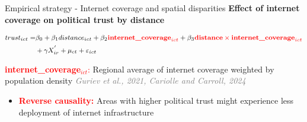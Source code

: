 \documentclass[10pt]{beamer}
\begin{document}
\begin{frame}{{\fontsize{13}{12}\selectfont
    Empirical strategy - Internet coverage and spatial disparities}}
\centering \textcolor{rougeprez}{\textbf{Effect of internet coverage on political trust by distance}}\vspace{1em}

\begin{equation}
    \fontsize{8}{10}\selectfont
\begin{split}
trust_{ict} = & \beta_{0} + \beta_{1} distance_{ict} + \beta_{2} \textcolor{red}{\textbf{internet\_coverage}_{ict}} + \beta_{3} \textcolor{red}{\textbf{distance} \times \textbf{internet\_coverage}_{ict}} \\
& + \gamma X^{'}_{ir} + \mu_{ct}+ \varepsilon_{ict}
\end{split}
\end{equation}\vspace{1em}

\noindent
{\fontsize{9}{12}\selectfont
\textcolor{red}{\textbf{internet\_coverage}$_{ict}$:} Regional average of internet coverage weighted by population density \textcolor{gray}{\textit{Guriev et al., 2021, Cariolle and Carroll, 2024}}
}
\vfill

\begin{itemize}
    \item \textcolor{red}{\textbf{Reverse causality:}} Areas with higher political trust might experience less deployment of internet infrastructure
\end{itemize}
\end{frame}
\end{document}
